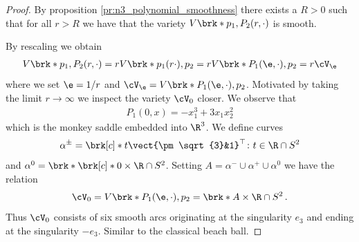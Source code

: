 \begin{proof}
  By proposition \ref{pr:n3_polynomial_smoothness} there exists a $R>0$ such that for all $r>R$ we have that the
  variety $V\brk*{p_1,P_2(r,\cdot)}$ is smooth.

  By rescaling we obtain
  \begin{align}
    V\brk*{p_1,P_2(r,\cdot)}=rV\brk*{p_1(r\cdot),p_2}
    =rV\brk*{P_1(\e,\cdot),p_2}=r\cV_\e\label{eq:n3_polynomial_smoothConnected_relVeps}
  \end{align}
  where we set $\e=1/r$ and $\cV_\e=V\brk*{P_1(\e,\cdot),p_2}$. Motivated by taking the limit $r\to\infty$ we
  inspect the variety $\cV_0$ closer. We observe that
  \begin{align*}
    P_1(0,x)=-x_1^3+3x_1x_2^2
  \end{align*}
  which is the monkey saddle embedded into $\R^3$. We define curves
  \begin{align*}
    \alpha^\pm=\brk[c]*{t\vect{\pm\sqrt{3}&1}^\top \colon t\in\R}\cap S^2
  \end{align*}
  and $\alpha^0=\brk*{\brk[c]*{0}\times\R}\cap S^2$. 
  Setting $A=\alpha^-\cup\alpha^+\cup\alpha^0$
  we have the relation
  \begin{align*}
    \cV_0=V\brk*{P_1(\e,\cdot),p_2}
    =\brk*{A\times\R}\cap S^2\,.
  \end{align*}
  Thus $\cV_0$ consists of six smooth arcs originating at the singularity $e_3$ and
  ending at the singularity $-e_3$. Similar to the classical beach ball.


\end{proof}
